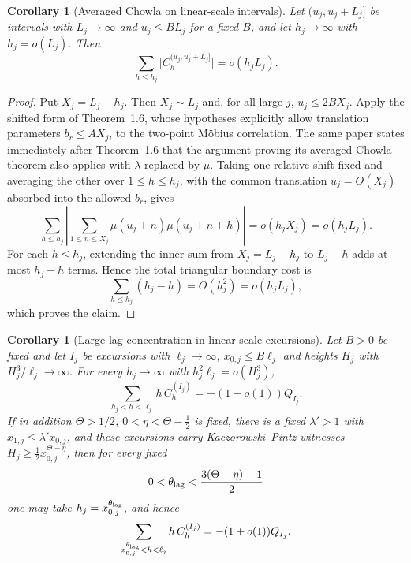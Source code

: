 \documentclass[11pt,reqno]{amsart}
\makeatletter
\let\CG@origcite\cite
\renewcommand*{\cite}[2][]{\def\CG@citekey{#2}%
  \ifx\relax#1\relax\CG@origcite{#2}\else\CG@origcite[#1]{#2}\fi}
\numberwithin{equation}{section}
\theoremstyle{plain}
\newtheorem{corollary}[theorem]{Corollary}
\theoremstyle{definition}
\theoremstyle{remark}
\makeatother
\begin{document}
\begin{corollary}[Averaged Chowla on linear-scale intervals]
\label{cor:chowla-linear}
Let $(u_j,u_j+L_j]$ be intervals with $L_j\to\infty$ and $u_j\le BL_j$ for a
fixed $B$, and let $h_j\to\infty$ with $h_j=o(L_j)$. Then
\begin{equation}
\sum_{h\le h_j}\bigl|C^{(u_j,u_j+L_j]}_h\bigr|=o(h_jL_j).
\end{equation}
\end{corollary}

\begin{proof}
Put $X_j=L_j-h_j$. Then $X_j\sim L_j$ and, for all large $j$,
$u_j\le2B X_j$. Apply the shifted form of
\cite[Theorem~1.6]{MRT15}, whose hypotheses explicitly allow translation
parameters $b_r\le A X_j$, to the two-point M\"obius correlation. The same
paper states immediately after Theorem~1.6 that the argument proving its
averaged Chowla theorem also applies with $\lambda$ replaced by $\mu$.
Taking one relative shift fixed and averaging the other over
$1\le h\le h_j$, with the common translation $u_j=O(X_j)$ absorbed into
the allowed $b_r$, gives
\begin{equation}
 \sum_{h\le h_j}\left|
 \sum_{1\le n\le X_j}\mu(u_j+n)\mu(u_j+n+h)
 \right|=o(h_jX_j)=o(h_jL_j).
\end{equation}
For each $h\le h_j$, extending the inner sum from $X_j=L_j-h_j$ to
$L_j-h$ adds at most $h_j-h$ terms. Hence the total triangular boundary
cost is
\begin{equation}
 \sum_{h\le h_j}(h_j-h)=O(h_j^2)=o(h_jL_j),
\end{equation}
which proves the claim.
\end{proof}

\begin{corollary}[Large-lag concentration in linear-scale excursions]
\label{cor:large-lag}
Let $B>0$ be fixed and let $I_j$ be excursions with $\ell_j\to\infty$,
$x_{0,j}\le B\ell_j$ and heights $H_j$ with $H_j^3/\ell_j\to\infty$. For every $h_j\to\infty$ with
$h_j^2\ell_j=o(H_j^3)$,
\begin{equation}
\sum_{h_j<h<\ell_j}h\,C^{(I_j)}_h=-(1+o(1))Q_{I_j}.
\end{equation}
If in addition $\Theta>1/2$, $0<\eta<\Theta-\frac12$ is fixed, there is a
fixed $\lambda'>1$ with $x_{1,j}\le\lambda' x_{0,j}$, and these excursions carry
Kaczorowski--Pintz witnesses
$H_j\ge\frac12x_{0,j}^{\Theta-\eta}$, then for every fixed
\begin{equation}
0<\theta_{\rm lag}<\frac{3(\Theta-\eta)-1}{2}
\end{equation}
one may take $h_j=x_{0,j}^{\theta_{\rm lag}}$, and hence
\begin{equation}
\sum_{x_{0,j}^{\theta_{\rm lag}}<h<\ell_j}h\,C_h^{(I_j)}=-(1+o(1))Q_{I_j}.
\end{equation}
\end{corollary}
\end{document}
